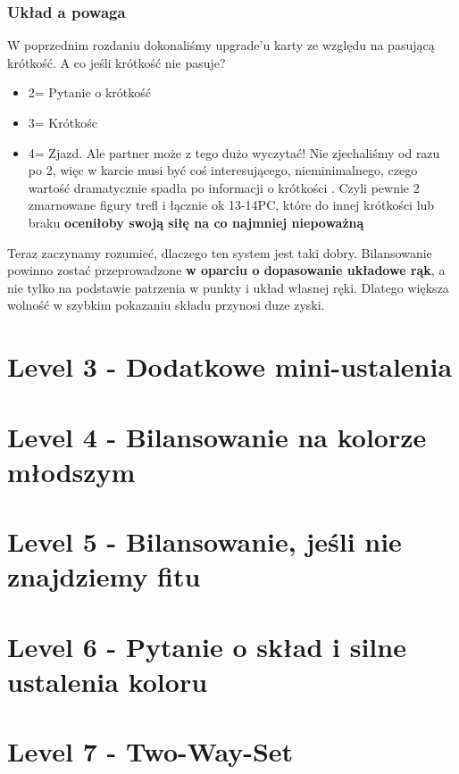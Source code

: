 \documentclass[12pt, a4paper]{article}
\begin{document}
\subsubsection*{Układ a powaga}

W poprzednim rozdaniu dokonaliśmy upgrade'u karty ze względu na pasującą krótkość. A co jeśli krótkość nie pasuje?

\vspace*{-1cm}

\begin{center}
	\webidding{
		1\hearts & 2\clubs \\
		2\hearts & 2\spades\alrt \\
		3\clubs\alrt & 4\hearts
	}
\end{center}

\begin{itemize}
	\item 2\spades = Pytanie o krótkość
	\item 3\clubs = Krótkośc \clubs
	\item 4\hearts = Zjazd. Ale partner może z tego dużo wyczytać! Nie zjechaliśmy od razu po 2\hearts, więc w karcie musi być coś interesującego, nieminimalnego, czego wartość dramatycznie spadła po informacji o krótkości \clubs. Czyli pewnie 2 zmarnowane figury trefl i łącznie ok 13-14PC, które do innej krótkości lub braku \textbf{oceniłoby swoją siłę na co najmniej niepoważną}
\end{itemize}

Teraz zaczynamy rozumieć, dlaczego ten system jest taki dobry. Bilansowanie powinno zostać przeprowadzone \textbf{w oparciu o dopasowanie układowe rąk}, a nie tylko na podstawie patrzenia w punkty i układ własnej ręki. Dlatego większa wolność w szybkim pokazaniu składu przynosi duze zyski.



\pagebreak
\vspace{2cm}
\section*{Level 3 - Dodatkowe mini-ustalenia}

\vspace{2cm}
\section*{Level 4 - Bilansowanie na kolorze młodszym}

\vspace{2cm}
\section*{Level 5 - Bilansowanie, jeśli nie znajdziemy fitu}

\vspace{2cm}
\section*{Level 6 - Pytanie o skład i silne ustalenia koloru}

\vspace{2cm}
\section*{Level 7 - Two-Way-Set}
\end{document}
